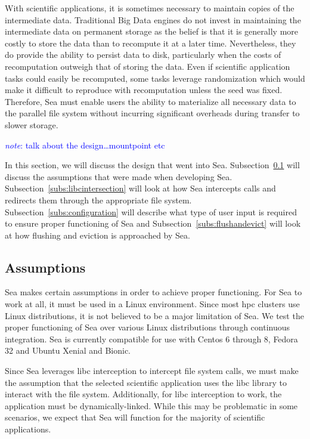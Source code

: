 \documentclass{report}
\newcommand{\note}[1]{\textcolor{blue}{\textit{note}: #1}}
\begin{document}
   With scientific applications, it is sometimes necessary to maintain copies of
   the intermediate data. Traditional Big Data engines do not invest in maintaining
   the intermediate data on permanent storage as the belief is that it is generally 
   more costly to store the data than to recompute it at a later time. Nevertheless,
   they do provide the ability to persist data to disk, particularly when the 
   costs of recomputation outweigh that of storing the data. Even if scientific application
   tasks could easily be recomputed, some tasks leverage randomization which would make
   it difficult to reproduce with recomputation unless the seed was fixed. Therefore,
   Sea must enable users the ability to materialize all necessary data to the parallel
   file system without incurring significant overheads during transfer to slower storage.

   \note{talk about the design\ldots mountpoint etc}

   In this section, we will discuss the design that went into Sea.
   Subsection~\ref{subs:assumption} will discuss the assumptions that were made
   when developing Sea. Subsection~\ref{subs:libcintersection} will look at how
   Sea intercepts calls and redirects them through the appropriate file system.
   Subsection~\ref{subs:configuration} will describe what type of user input
   is required to ensure proper functioning of Sea and Subsection~\ref{subs:flushandevict}
   will look at how flushing and eviction is approached by Sea.

   \subsection{Assumptions}\label{subs:assumption}

   Sea makes certain assumptions in order to achieve proper functioning. For Sea to
   work at all, it must be used in a Linux environment. Since most \gls{hpc} clusters
   use Linux distributions, it is not believed to be a major limitation of Sea. We test
   the proper functioning of Sea over various Linux distributions through continuous
   integration. Sea is currently compatible for use with Centos 6 through 8, Fedora 32
   and Ubuntu Xenial and Bionic.

   Since Sea leverages libc interception to intercept file system calls, we must
   make the assumption that the selected scientific application uses the libc library
   to interact with the file system. Additionally, for libc interception to work,
   the application must be dynamically-linked. While this may be problematic in some
   scenarios, we expect that Sea will function for the majority of scientific applications.
\end{document}
